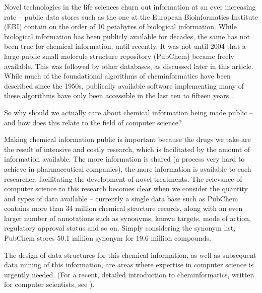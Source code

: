 \documentclass{sig-alternate}
\begin{document}
Novel technologies in the life sciences churn out information at an
ever increasing rate -- public data stores such as the one at the
European Bioinformatics Institute (EBI) contain on the order of 10
petabytes of biological information.  While biological information has
been publicly available for decades, the same has not been true for
chemical information, until recently. It was not until 2004 that a
large public small molecule structure repository (PubChem) became
freely available. This was followed by other databases, as discussed
later in this article. While much of the foundational algorithms of
cheminformatics have been described since the 1950s, publically
available software implementing many of these algorithms have only
been accessible in the last ten to fifteen years \cite{faulon2010}.

So why should we actually care about chemical information being made
public -- and how does this relate to the field of computer science?

Making chemical information public is important because the drugs we
take are the result of intensive and costly research, which is
facilitated by the amount of information available. The more
information is shared (a process very hard to achieve in
pharmaceutical companies), the more information is available to each
researcher, facilitating the development of novel treatments. The
relevance of computer science to this research becomes clear when we
consider the quantity and types of data available -- currently a
single data base such as PubChem contains more than 34 million
chemical structure records, along with an even larger number of
annotations such as synonyms, known targets, mode of action,
regulatory approval status and so on.  Simply considering the synonym
list, PubChem stores 50.1 million synonym for 19.6 million compounds.

The design of data structures for this chemical information, as well
as subsequent data mining of this information, are areas where
expertise in computer science is urgently needed. (For a recent,
detailed introduction to cheminformatics, written for computer
scientists, see \cite{brown2009}).
\end{document}
